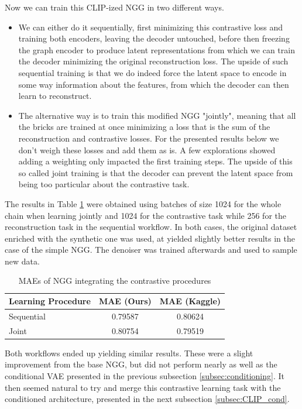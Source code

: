 \documentclass[10pt,twocolumn,letterpaper]{article}
\begin{document}
\noindent
Now we can train this CLIP-ized NGG in two different ways.
\begin{itemize}
    \item We can either do it sequentially, first minimizing this contrastive loss and training both encoders, leaving the decoder untouched, before then freezing the graph encoder to produce latent representations from which we can train the decoder minimizing the original reconstruction loss. The upside of such sequential training is that we do indeed force the latent space to encode in some way information about the features, from which the decoder can then learn to reconstruct.
    \item The alternative way is to train this modified NGG "jointly", meaning that all the bricks are trained at once minimizing a loss that is the sum of the reconstruction and contrastive losses. For the presented results below we don't weigh these losses and add them as is. A few explorations showed adding a weighting only impacted the first training steps. The upside of this so called joint training is that the decoder can prevent the latent space from being too particular about the contrastive task.
\end{itemize} 

The results in Table \ref{tab:clip} were obtained using batches of size 1024 for the whole chain when learning jointly and 1024 for the contrastive task while 256 for the reconstruction task in the sequential workflow. In both cases, the original dataset enriched with the synthetic one was used, at yielded slightly better results in the case of the simple NGG. The denoiser was trained afterwards and used to sample new data.

\begin{table}[h!]
    \centering
    \begin{tabular}{|l|c|c|}
    
        \hline
        \textbf{Learning Procedure} & \textbf{MAE (Ours)} & \textbf{MAE (Kaggle)} \\
        \hline
        Sequential & 0.79587 & 0.80624 \\
        Joint & 0.80754 & 0.79519 \\
        \hline
    \end{tabular}
    \caption{MAEs of NGG integrating the contrastive procedures}
    \label{tab:clip}
\end{table}

Both workflows ended up yielding similar results. These were a slight improvement from the base NGG, but did not perform nearly as well as the conditional VAE presented in the previous subsection \ref{subsec:conditioning}. It then seemed natural to try and merge this contrastive learning task with the conditioned architecture, presented in the next subsection \ref{subsec:CLIP_cond}.
\end{document}
